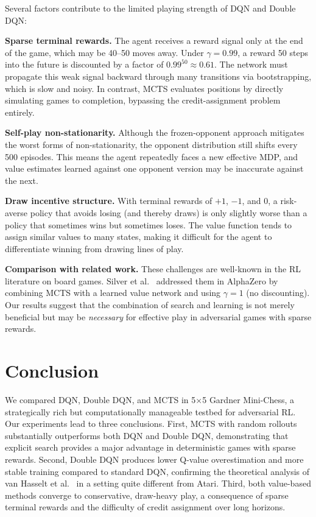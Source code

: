 \documentclass[letterpaper]{article}
\begin{document}
Several factors contribute to the limited playing strength of DQN and Double DQN:

\textbf{Sparse terminal rewards.}
The agent receives a reward signal only at the end of the game, which may be 40--50 moves away.
Under $\gamma = 0.99$, a reward 50 steps into the future is discounted by a factor of $0.99^{50} \approx 0.61$.
The network must propagate this weak signal backward through many transitions via bootstrapping, which is slow and noisy.
In contrast, MCTS evaluates positions by directly simulating games to completion, bypassing the credit-assignment problem entirely.

\textbf{Self-play non-stationarity.}
Although the frozen-opponent approach mitigates the worst forms of non-stationarity, the opponent distribution still shifts every 500 episodes.
This means the agent repeatedly faces a new effective MDP, and value estimates learned against one opponent version may be inaccurate against the next.

\textbf{Draw incentive structure.}
With terminal rewards of $+1$, $-1$, and $0$, a risk-averse policy that avoids losing (and thereby draws) is only slightly worse than a policy that sometimes wins but sometimes loses.
The value function tends to assign similar values to many states, making it difficult for the agent to differentiate winning from drawing lines of play.

\textbf{Comparison with related work.}
These challenges are well-known in the RL literature on board games.
Silver et al.~\cite{silver2018general} addressed them in AlphaZero by combining MCTS with a learned value network and using $\gamma = 1$ (no discounting).
Our results suggest that the combination of search and learning is not merely beneficial but may be \emph{necessary} for effective play in adversarial games with sparse rewards.


\section{Conclusion}

We compared DQN, Double DQN, and MCTS in 5$\times$5 Gardner Mini-Chess, a strategically rich but computationally manageable testbed for adversarial RL.
Our experiments lead to three conclusions.
First, MCTS with random rollouts substantially outperforms both DQN and Double DQN, demonstrating that explicit search provides a major advantage in deterministic games with sparse rewards.
Second, Double DQN produces lower Q-value overestimation and more stable training compared to standard DQN, confirming the theoretical analysis of van Hasselt et al.~\cite{van2016deep} in a setting quite different from Atari.
Third, both value-based methods converge to conservative, draw-heavy play, a consequence of sparse terminal rewards and the difficulty of credit assignment over long horizons.
\end{document}
